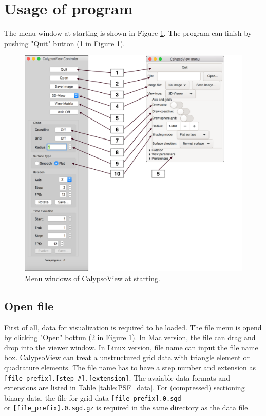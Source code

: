 \section{Usage of program}
\label{section:usage}
The menu window at starting is shown in Figure \ref{fig:menu_1}. The program can finish by pushing "Quit" button (1 in Figure \ref{fig:menu_1}).
%
\begin{figure}[htbp]
\begin{center}
\includegraphics*[width=120mm]{Images/menu_1}
\end{center}
\caption{Menu windows of CalypsoView at starting.}
\label{fig:menu_1}
\end{figure}
%

\subsection{Open file}
First of all, data for visualization is required to be loaded. The file menu is opend by clicking "Open" bottun 
(2 in Figure \ref{fig:menu_1}). In Mac version, the file can drag and drop into the viewer window. In Linux version, file name can input the file name box. CalypsoView can treat a unstructured grid data with triangle element or quadrature elements. The file name has to have a step number and extension as \verb|[file_prefix].[step #].[extension]|. The avaiable data formats and extensions are listed in Table \ref{table:PSF_data}. For (compressed) sectioning binary data, the file for grid data \verb|[file_prefix].0.sgd| \\
  or \verb|[file_prefix].0.sgd.gz| is required in the same directory as the data file.

